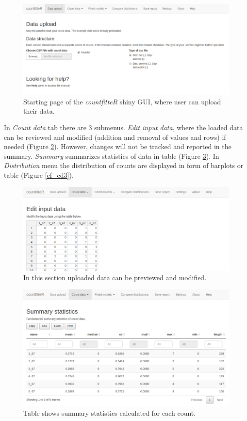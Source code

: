 \begin{figure}[htbp]
  \centering
  \includegraphics[width=0.99\columnwidth]{fig/cf_main.png}
  \caption{Starting page of the \emph{countfitteR} shiny GUI, where user can upload their data.}
    \label{cf_main}
\end{figure}

In \textit{Count data} tab there are 3 submenus. \textit{Edit input data}, where the loaded data can be reviewed and modified (addition and removal of values and rows) if needed (Figure \ref{cf_cd1}). However, changes will not be tracked and reported in the summary. \textit{Summary} summarizes statistics of data in table (Figure \ref{cf_cd2}). In \textit{Distribution} menu the distribution of counts are displayed in form of barplots or table (Figure \ref{cf_cd3}).

\begin{figure}[htbp]
  \centering
  \includegraphics[width=0.99\columnwidth]{fig/cf_cd1.png}
  \caption{In this section uploaded data can be previewed and modified.}
    \label{cf_cd1}
\end{figure}

\begin{figure}[htbp]
  \centering
  \includegraphics[width=0.99\columnwidth]{fig/cf_cd2.png}
  \caption{Table shows summary statistics calculated for each count.}
    \label{cf_cd2}
\end{figure}

